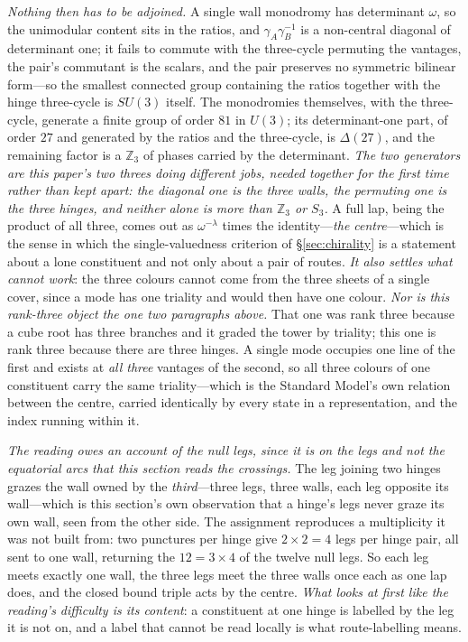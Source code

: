 \documentclass[11pt]{article}
\begin{document}
\emph{Nothing then has to be adjoined.} A single wall monodromy has determinant $\omega$, so the unimodular
content sits in the ratios, and $\gamma_A\gamma_B^{-1}$ is a non-central diagonal of determinant one; it fails
to commute with the three-cycle permuting the vantages, the pair's commutant is the scalars, and the pair
preserves no symmetric bilinear form---so the smallest connected group containing the ratios together with the
hinge three-cycle is $SU(3)$ itself. The monodromies themselves, with the three-cycle, generate a finite group
of order $81$ in $U(3)$; its determinant-one part, of order $27$ and generated by the ratios and the three-cycle,
is $\Delta(27)$, and the remaining factor is a $\mathbb{Z}_3$ of phases carried by the
determinant. \emph{The two generators are this paper's two threes
doing different jobs, needed together for the first time rather than kept apart: the diagonal one is the three
walls, the permuting one is the three hinges, and neither alone is more than $\mathbb{Z}_3$ or $S_3$.} A full
lap, being the product of all three, comes out as $\omega^{-\lambda}$ times the identity---\emph{the
centre}---which is the sense in which the single-valuedness criterion of \S\ref{sec:chirality} is a statement
about a lone constituent and not only about a pair of routes. \emph{It also settles what cannot work}: the
three colours cannot come from the three sheets of a single cover, since a mode has one triality and would then
have one colour. \emph{Nor is this rank-three object the one two paragraphs above.}
That one was rank three because a cube root has three branches and it graded the tower by triality; this one is
rank three because there are three hinges. A single mode occupies one line of the first and exists at
\emph{all three} vantages of the second, so all three colours of one constituent carry the same
triality---which is the Standard Model's own relation between the centre, carried identically by every state in
a representation, and the index running within it.

\emph{The reading owes an account of the null legs, since it is on the legs and not the equatorial arcs that
this section reads the crossings.} The leg joining two hinges grazes the
wall owned by the \emph{third}---three legs, three walls, each leg opposite its wall---which is this section's
own observation that a hinge's legs never graze its own wall, seen from the other side. The assignment
reproduces a multiplicity it was not built from: two punctures per hinge give $2\times2=4$ legs per hinge pair,
all sent to one wall, returning the $12=3\times4$ of the twelve null legs. So each leg meets exactly one wall,
the three legs meet the three walls once each as one lap does, and the closed bound triple acts by the centre.
\emph{What looks at first like the reading's difficulty is its content}: a constituent at one hinge is labelled
by the leg it is not on, and a label that cannot be read locally is what route-labelling means.
\end{document}
